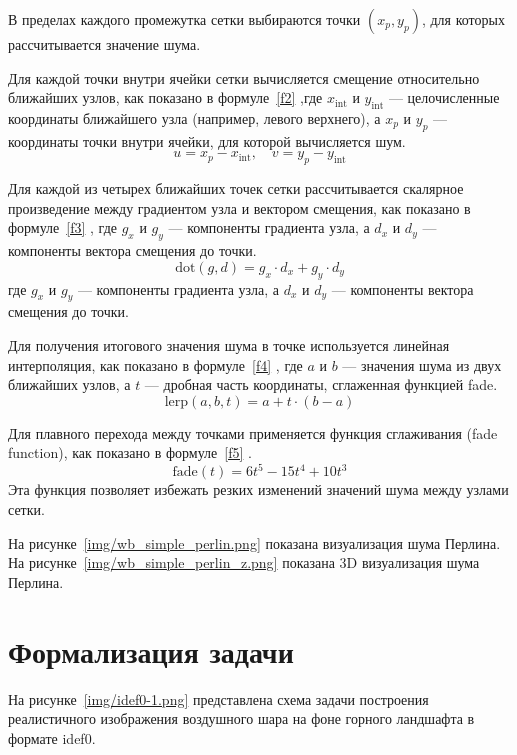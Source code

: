 В пределах каждого промежутка сетки выбираются точки $(x_p, y_p)$, для которых рассчитывается значение шума.

Для каждой точки внутри ячейки сетки вычисляется смещение относительно ближайших узлов, как показано в формуле~\ref{f2} \cite{real_time},где $x_{\text{int}}$ и $y_{\text{int}}$ — целочисленные координаты ближайшего узла (например, левого верхнего), а $x_p$ и $y_p$ — координаты точки внутри ячейки, для которой вычисляется шум.
\begin{equation}
u = x_p - x_{\text{int}}, \quad v = y_p - y_{\text{int}}
\label{f2}
\end{equation}


Для каждой из четырех ближайших точек сетки рассчитывается скалярное произведение между градиентом узла и вектором смещения, как показано в формуле~\ref{f3} \cite{real_time}, где $g_x$ и $g_y$ — компоненты градиента узла, а $d_x$ и $d_y$ — компоненты вектора смещения до точки.
\begin{equation}
\text{dot}(g, d) = g_x \cdot d_x + g_y \cdot d_y
\label{f3}
\end{equation}
где $g_x$ и $g_y$ — компоненты градиента узла, а $d_x$ и $d_y$ — компоненты вектора смещения до точки.

Для получения итогового значения шума в точке используется линейная интерполяция, как показано в формуле~\ref{f4} \cite{real_time}, где $a$ и $b$ — значения шума из двух ближайших узлов, а $t$ — дробная часть координаты, сглаженная функцией fade.
\begin{equation}
\text{lerp}(a, b, t) = a + t \cdot (b - a)
\label{f4}
\end{equation}


Для плавного перехода между точками применяется функция сглаживания (fade function), как показано в формуле~\ref{f5} \cite{real_time}.
\begin{equation}
\text{fade}(t) = 6t^5 - 15t^4 + 10t^3
\label{f5}
\end{equation}
Эта функция позволяет избежать резких изменений значений шума между узлами сетки.

На рисунке~\ref{img/wb_simple_perlin.png} показана визуализация шума Перлина. На рисунке~\ref{img/wb_simple_perlin_z.png} показана 3D визуализация шума Перлина.



\section{Формализация задачи}
На рисунке~\ref{img/idef0-1.png} представлена схема задачи построения реалистичного изображения воздушного шара на фоне горного ландшафта в формате idef0.

